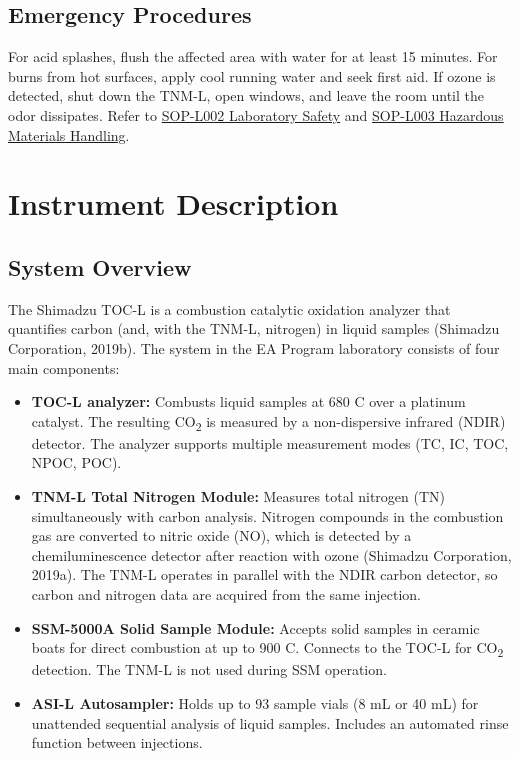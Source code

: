 \documentclass[
  11pt,
  letterpaper,
]{article}
\providecommand{\tightlist}{%
  \setlength{\itemsep}{0pt}\setlength{\parskip}{0pt}}
\begin{document}
\subsection{Emergency Procedures}\label{emergency-procedures}

For acid splashes, flush the affected area with water for at least 15
minutes. For burns from hot surfaces, apply cool running water and seek
first aid. If ozone is detected, shut down the TNM-L, open windows, and
leave the room until the odor dissipates. Refer to
\href{SOP-L002-laboratory-safety.qmd}{SOP-L002 Laboratory Safety} and
\href{SOP-L003-hazardous-materials-handling.qmd}{SOP-L003 Hazardous
Materials Handling}.

\section{Instrument Description}\label{instrument-description}

\subsection{System Overview}\label{system-overview}

The Shimadzu TOC-L is a combustion catalytic oxidation analyzer that
quantifies carbon (and, with the TNM-L, nitrogen) in liquid samples
(Shimadzu Corporation, 2019b). The system in the EA Program laboratory
consists of four main components:

\begin{itemize}
\tightlist
\item
  \textbf{TOC-L analyzer:} Combusts liquid samples at 680 C over a
  platinum catalyst. The resulting CO\textsubscript{2} is measured by a
  non-dispersive infrared (NDIR) detector. The analyzer supports
  multiple measurement modes (TC, IC, TOC, NPOC, POC).
\item
  \textbf{TNM-L Total Nitrogen Module:} Measures total nitrogen (TN)
  simultaneously with carbon analysis. Nitrogen compounds in the
  combustion gas are converted to nitric oxide (NO), which is detected
  by a chemiluminescence detector after reaction with ozone (Shimadzu
  Corporation, 2019a). The TNM-L operates in parallel with the NDIR
  carbon detector, so carbon and nitrogen data are acquired from the
  same injection.
\item
  \textbf{SSM-5000A Solid Sample Module:} Accepts solid samples in
  ceramic boats for direct combustion at up to 900 C. Connects to the
  TOC-L for CO\textsubscript{2} detection. The TNM-L is not used during
  SSM operation.
\item
  \textbf{ASI-L Autosampler:} Holds up to 93 sample vials (8 mL or 40
  mL) for unattended sequential analysis of liquid samples. Includes an
  automated rinse function between injections.
\end{itemize}
\end{document}
